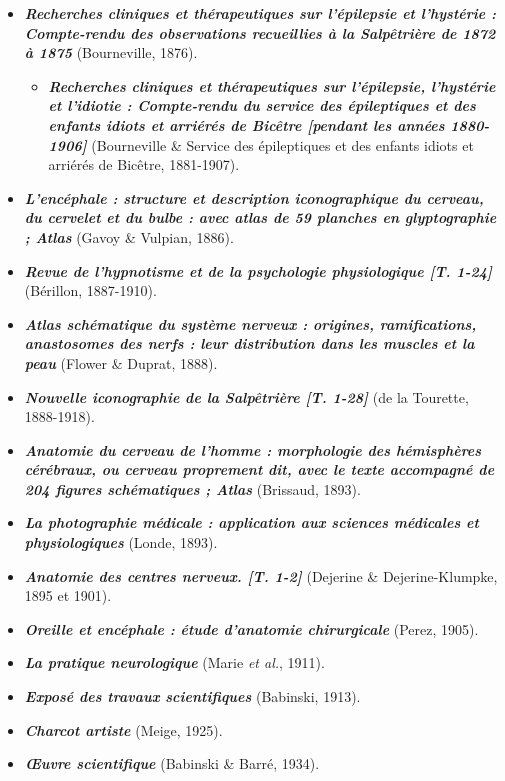 \begin{itemize}
	\item \textbf{\textit{Recherches cliniques et thérapeutiques sur l'épilepsie et l'hystérie : Compte-rendu des observations recueillies à la Salpêtrière de 1872 à 1875}} (Bourneville, 1876).
	\begin{itemize}
		\item \textbf{\textit{Recherches cliniques et thérapeutiques sur l'épilepsie, l'hystérie et l'idiotie : Compte-rendu du service des épileptiques et des enfants idiots et arriérés de Bicêtre [pendant les années 1880-1906]}} (Bourneville \& Service des épileptiques et des enfants idiots et arriérés de Bicêtre, 1881-1907).
	\end{itemize}
	\item \textbf{\textit{L'encéphale : structure et description iconographique du cerveau, du cervelet et du bulbe : avec atlas de 59 planches en glyptographie ; Atlas}} (Gavoy \& Vulpian, 1886).
	\item \textbf{\textit{Revue de l'hypnotisme et de la psychologie physiologique [T. 1-24]}} (Bérillon, 1887-1910).
	\item \textbf{\textit{Atlas schématique du système nerveux : origines, ramifications, anastosomes des nerfs : leur distribution dans les muscles et la peau}} (Flower \& Duprat, 1888).
	\item \textbf{\textit{Nouvelle iconographie de la Salpêtrière [T. 1-28]}} (de la Tourette, 1888-1918).
	\item \textbf{\textit{Anatomie du cerveau de l'homme : morphologie des hémisphères cérébraux, ou cerveau proprement dit, avec le texte accompagné de 204 figures schématiques ; Atlas}} (Brissaud, 1893).
	\item \textbf{\textit{La photographie médicale : application aux sciences médicales et physiologiques}} (Londe, 1893).
	\item \textbf{\textit{Anatomie des centres nerveux. [T. 1-2]}} (Dejerine \& Dejerine-Klumpke, 1895 et 1901).
	\item \textbf{\textit{Oreille et encéphale : étude d'anatomie chirurgicale}} (Perez, 1905).
	\item \textbf{\textit{La pratique neurologique}} (Marie \textit{et al.}, 1911).
	\item \textbf{\textit{Exposé des travaux scientifiques}} (Babinski, 1913).
	\item \textbf{\textit{Charcot artiste}} (Meige, 1925).
	\item \textbf{\textit{\OE{}uvre scientifique}} (Babinski \& Barré, 1934).
\end{itemize}
\bigskip

